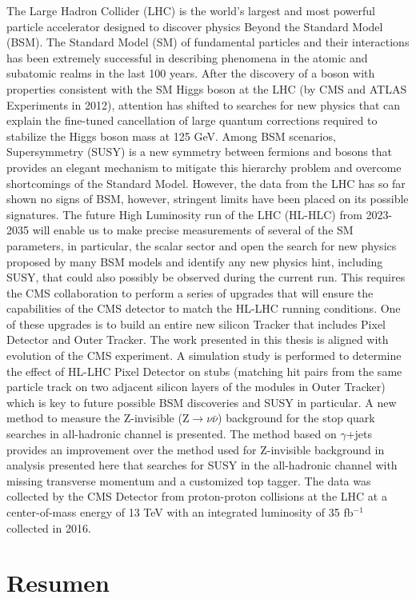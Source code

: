 \documentclass[12pt,twoside,openany]{book}
\begin{document}
The Large Hadron Collider (LHC) is the world's largest and most powerful particle accelerator designed to discover physics Beyond the Standard Model (BSM). The Standard Model (SM) of fundamental particles and their interactions has been extremely successful in describing phenomena in the atomic and subatomic realms in the last 100 years. After the discovery of a boson with properties consistent with the SM Higgs boson at the LHC (by CMS and ATLAS Experiments in 2012), attention has shifted to searches for new physics that can explain the fine-tuned cancellation of large quantum corrections required to stabilize the Higgs boson mass at 125 GeV. Among BSM scenarios, Supersymmetry (SUSY) is a new symmetry between fermions and bosons that provides an elegant mechanism to mitigate this hierarchy problem and overcome shortcomings of the Standard Model. However, the data from the LHC has so far shown no signs of BSM, however, stringent limits have been placed on its possible signatures. The future High Luminosity run of the LHC (HL-HLC) from 2023-2035 will enable us to make precise measurements of several of the SM parameters, in particular, the scalar sector and open the search for new physics proposed by many BSM models and identify any new physics hint, including SUSY, that could also possibly be observed during the current run. This requires the CMS collaboration to perform a series of upgrades that will ensure the capabilities of the CMS detector to match the HL-LHC running conditions. One of these upgrades is to build an entire new silicon Tracker that includes Pixel Detector and Outer Tracker. The work presented in this thesis is aligned with evolution of the CMS experiment. A simulation study is performed to determine the effect of HL-LHC Pixel Detector on stubs (matching hit pairs from the same particle track on two adjacent silicon layers of the modules in Outer Tracker) which is key to future possible BSM discoveries and SUSY in particular. A new method to measure the Z-invisible (Z$\rightarrow \nu\bar{\nu}$) background for the stop quark searches in all-hadronic channel is presented. The method based on $\gamma$+jets provides an improvement over the method used for Z-invisible background in analysis presented here that searches for SUSY in the all-hadronic channel with missing transverse momentum and a customized top tagger. The data was collected by the CMS Detector from proton-proton collisions at the LHC at a center-of-mass energy of 13 TeV with an integrated luminosity of 35 fb$^{-1}$ collected in 2016.

\chapter*{Resumen}
\end{document}
